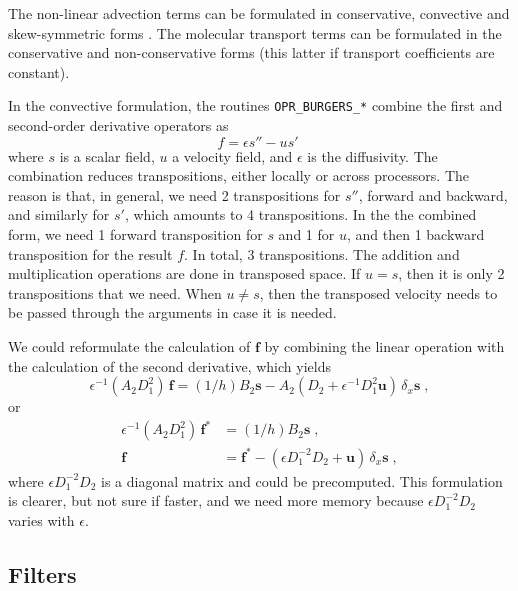 The non-linear advection terms can be formulated in conservative, convective and skew-symmetric forms \citep{Blaisdell:1996,Kravchenko:1997}. The molecular transport terms can be formulated in the conservative and non-conservative forms (this latter if transport coefficients are constant).

In the convective formulation, the routines {\tt OPR\_BURGERS\_*} combine the first and second-order derivative operators as 
\begin{equation}
f=\epsilon s'' - u s'\;
\end{equation}
where $s$ is a scalar field, $u$ a velocity field, and $\epsilon$ is the diffusivity. The combination reduces transpositions, either locally or across processors. The reason is that, in general, we need 2 transpositions for $s''$, forward and backward, and similarly for $s'$, which amounts to 4 transpositions. In the the combined form, we need 1 forward transposition for $s$ and 1 for $u$, and then 1 backward transposition for the result $f$. In total, 3 transpositions. The addition and multiplication operations are done in transposed space. If $u= s$, then it is only 2 transpositions that we need. When $u\ne s$, then the transposed velocity needs to be passed through the arguments in case it is needed.

We could reformulate the calculation of $\mathbf{f}$ by combining the linear operation with the calculation of the second derivative, which yields
\begin{equation}
    \epsilon^{-1}(A_2D_1^2)\, \mathbf{f}=(1/h)B_2 \mathbf{s}
    - A_2(D_2 + \epsilon^{-1}D_1^2\mathbf{u})\,\delta_x  \mathbf{s} \;,
\end{equation}
or
\begin{subequations}
  \begin{align}
    \epsilon^{-1}(A_2D_1^2)\, \mathbf{f}^*&=(1/h)B_2 \mathbf{s} \;,\\
    \mathbf{f}&= \mathbf{f}^*- (\epsilon D_1^{-2}D_2 + \mathbf{u})\,\delta_x  \mathbf{s} \;,
  \end{align}
\end{subequations}
where $\epsilon D_1^{-2}D_2$ is a diagonal matrix and could be precomputed. This formulation is clearer, but not sure if faster, and we need more memory because $\epsilon D_1^{-2}D_2$ varies with $\epsilon$.

\subsection{Filters}\label{sec:filters}

